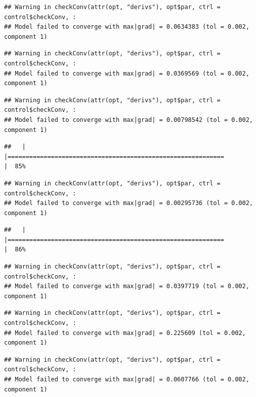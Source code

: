 \documentclass[
  12pt,
]{book}
\begin{document}
\begin{verbatim}
## Warning in checkConv(attr(opt, "derivs"), opt$par, ctrl = control$checkConv, :
## Model failed to converge with max|grad| = 0.0634383 (tol = 0.002, component 1)
\end{verbatim}

\begin{verbatim}
## Warning in checkConv(attr(opt, "derivs"), opt$par, ctrl = control$checkConv, :
## Model failed to converge with max|grad| = 0.0369569 (tol = 0.002, component 1)
\end{verbatim}

\begin{verbatim}
## Warning in checkConv(attr(opt, "derivs"), opt$par, ctrl = control$checkConv, :
## Model failed to converge with max|grad| = 0.00798542 (tol = 0.002, component 1)
\end{verbatim}

\begin{verbatim}
##   |                                                                              |============================================================          |  85%
\end{verbatim}

\begin{verbatim}
## Warning in checkConv(attr(opt, "derivs"), opt$par, ctrl = control$checkConv, :
## Model failed to converge with max|grad| = 0.00295736 (tol = 0.002, component 1)
\end{verbatim}

\begin{verbatim}
##   |                                                                              |============================================================          |  86%
\end{verbatim}

\begin{verbatim}
## Warning in checkConv(attr(opt, "derivs"), opt$par, ctrl = control$checkConv, :
## Model failed to converge with max|grad| = 0.0397719 (tol = 0.002, component 1)
\end{verbatim}

\begin{verbatim}
## Warning in checkConv(attr(opt, "derivs"), opt$par, ctrl = control$checkConv, :
## Model failed to converge with max|grad| = 0.225609 (tol = 0.002, component 1)
\end{verbatim}

\begin{verbatim}
## Warning in checkConv(attr(opt, "derivs"), opt$par, ctrl = control$checkConv, :
## Model failed to converge with max|grad| = 0.0607766 (tol = 0.002, component 1)
\end{verbatim}
\end{document}
